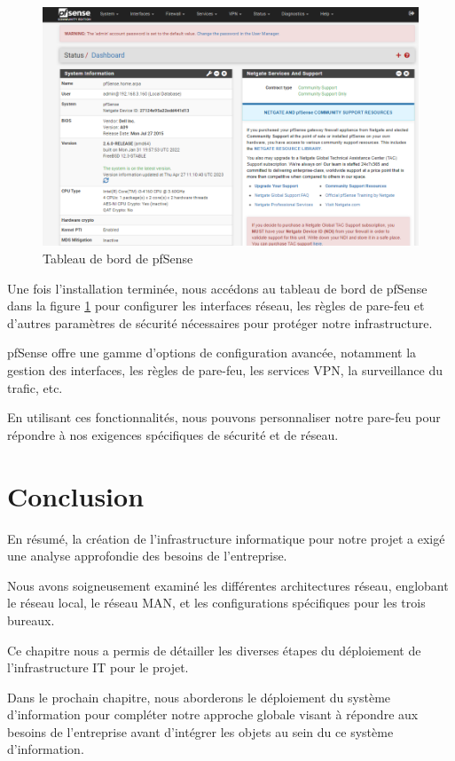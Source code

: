 \begin{figure}[H]
\centering
\includegraphics[width=15cm]{Images/BRadesMelian-Topologie14.png}
\caption{Tableau de bord de pfSense}
\label{Chap3.3.9}
\end{figure}

Une fois l'installation terminée, nous accédons au tableau de bord de pfSense dans la figure \ref{Chap3.3.9}  pour configurer les interfaces réseau, les règles de pare-feu et d'autres paramètres de sécurité nécessaires pour protéger notre infrastructure.

pfSense offre une gamme d'options de configuration avancée, notamment la gestion des interfaces, les règles de pare-feu, les services VPN, la surveillance du trafic, etc. 

En utilisant ces fonctionnalités, nous pouvons personnaliser notre pare-feu pour répondre à nos exigences spécifiques de sécurité et de réseau.

\section{Conclusion}

En résumé, la création de l'infrastructure informatique pour notre projet a exigé une analyse approfondie des besoins de l'entreprise.

Nous avons soigneusement examiné les différentes architectures réseau, englobant le réseau local, le réseau MAN, et les configurations spécifiques pour les trois bureaux.

Ce chapitre nous a permis de détailler les diverses étapes du déploiement de l'infrastructure IT pour le projet. 

Dans le prochain chapitre, nous aborderons le déploiement du système d'information pour compléter notre approche globale visant à répondre aux besoins de l'entreprise avant d'intégrer les objets au sein du ce système d'information.